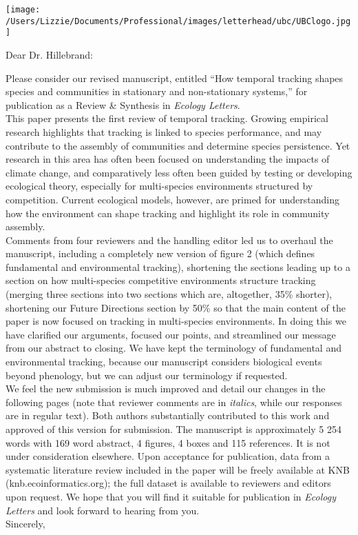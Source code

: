 \documentclass[11pt,a4paper]{letter}
\begin{document}
\begin{letter}{}
\texttt{[image: /Users/Lizzie/Documents/Professional/images/letterhead/ubc/UBClogo.jpg]}\\
\opening{Dear Dr. Hillebrand:}
Please consider our revised manuscript, entitled ``How temporal tracking shapes species and communities in stationary and non-stationary systems,'' for publication as a Review \& Synthesis in \emph{Ecology Letters}. 
\vspace{1.5ex}\\
This paper presents the first review of temporal tracking. Growing empirical research highlights that tracking is linked to species performance, and may contribute to the assembly of communities and determine species persistence. Yet research in this area has often been focused on understanding the impacts of climate change, and comparatively less often been guided by testing or developing ecological theory, especially for multi-species environments structured by competition. Current ecological models, however, are primed for understanding how the environment can shape tracking and highlight its role in community assembly. %
\vspace{1.5ex}\\
Comments from four reviewers and the handling editor led us to overhaul the manuscript, including a completely new version of figure 2 (which defines fundamental and environmental tracking), shortening the sections leading up to a section on how multi-species competitive environments structure tracking (merging three sections into two sections which are, altogether, 35\% shorter), shortening our Future Directions section by 50\% so that the main content of the paper is now focused on tracking in multi-species environments. In doing this we have clarified our arguments, focused our points, and streamlined our message from our abstract to closing. We have kept the terminology of fundamental and environmental tracking, because our manuscript considers biological events beyond phenology, but we can adjust our terminology if requested. 
\vspace{1.5ex}\\
We feel the new submission is much improved and detail our changes in the following pages (note that reviewer comments are in \emph{italics}, while our responses are in regular text). Both authors substantially contributed to this work and approved of this version for submission. The manuscript is approximately 5 254 words with 169 word abstract, 4 figures, 4 boxes and 115 references. It is not under consideration elsewhere. Upon acceptance for publication, data from a systematic literature review included in the paper will be freely available at KNB (knb.ecoinformatics.org); the full dataset is available to reviewers and editors upon request. We hope that you will find it suitable for publication in \emph{Ecology Letters} and look forward to hearing from you.
\vspace{1.5ex}\\
Sincerely,\\


\end{letter}
\end{document}
